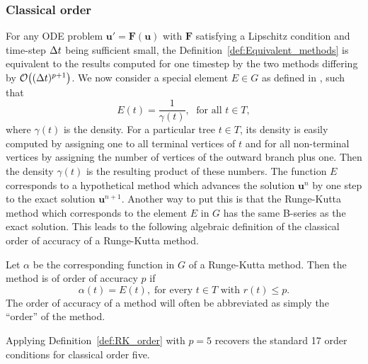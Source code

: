 \subsubsection{Classical order}\label{sec:Classical_order}

\indent For any ODE problem $\bm{u}'= \bm{F}(\bm{u})$ with $\bm{F}$ satisfying a Lipschitz condition and time-step $\Delta t$ being sufficient small, the Definition~\ref{def:Equivalent_methods} is equivalent to the results computed for one timestep by the two methods differing by $\mathcal{O}\bigl((\Delta t)^{p+1}\bigr)$.
We now consider a special element $E \in G$ as defined in \cite{Butcher1987_book}, such that
\begin{displaymath}
 	E(t) = \frac{1}{\gamma(t)}, \; \text{ for all } t \in T,
\end{displaymath}
where $\gamma(t)$ is the density. For a particular tree $t \in T$, its density is easily computed by assigning one to all terminal vertices of $t$ and for all non-terminal vertices by assigning the number of vertices of the outward branch plus one. Then the density $\gamma(t)$ is the resulting product of these numbers. The function $E$ corresponds to a hypothetical method which advances the solution $\bm{u}^n$ by one step to the exact solution $\bm{u}^{n+1}$.  Another way to put this is that the Runge-Kutta method which corresponds to the element $E$ in $G$ has the same B-series as the exact solution. This leads to the following algebraic definition of the classical order of accuracy of a Runge-Kutta method.
\begin{definition}\label{def:RK_order}
	Let $\alpha$ be the corresponding function in $G$ of a Runge-Kutta method. Then the method is of order of accuracy $p$ if
	\begin{displaymath}
		\alpha(t) = E(t), \; \text{for every } t \in T \text{ with } r(t) \leq p.
	\end{displaymath}
	The order of accuracy of a method will often be abbreviated as simply the ``order'' of the method.
\end{definition}
\begin{example}\label{ex:Order_conditions}
	Applying Definition~\ref{def:RK_order} with $p=5$ recovers the standard 17 order conditions for classical order five.
\end{example}
